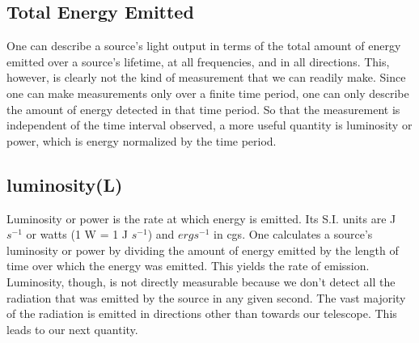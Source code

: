 \documentclass[10pt]{report}
\begin{document}
\subsection{Total Energy Emitted}
One can describe a source's light output in terms of the total amount of energy emitted over a source's lifetime, at all frequencies, and in all directions.  This, however, is clearly not the kind of measurement that we can readily make.  Since one can make measurements only over a finite time period, one can only describe the amount of energy detected in that time period.  So that the measurement is independent of the time interval observed, a more useful quantity is luminosity or power, which is energy normalized by the time period. 
\subsection{luminosity(L)}
Luminosity or power is the rate at which energy is emitted.  Its S.I. units are J $s^{-1}$ or watts (1 W = 1 J $s^{-1}$) and $erg s^{-1}$ in cgs.  One calculates a source's luminosity or power by dividing the amount of energy emitted by the length of time over which the energy was emitted.  This yields the rate of emission.   \\
Luminosity, though, is not directly measurable because we don't detect all the radiation that was emitted by the source in any given second.  The vast majority of the radiation is emitted in directions other than towards our telescope.  This leads to our next quantity. 
\end{document}
